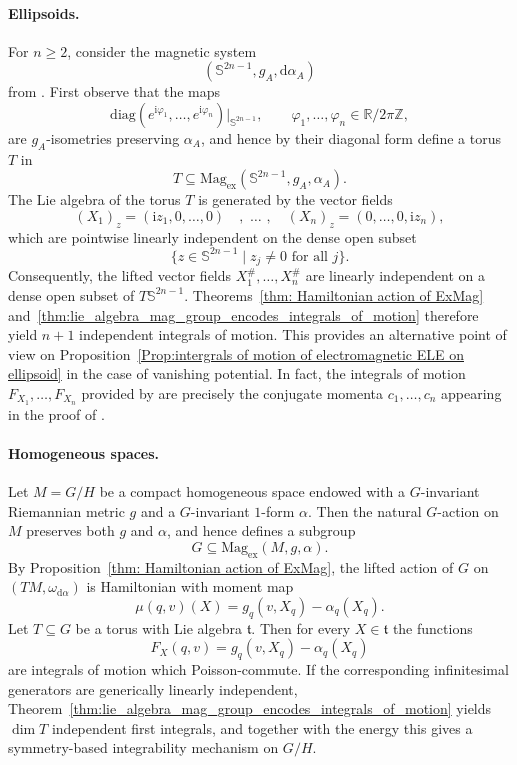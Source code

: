 \documentclass[11pt,reqno]{amsart}
\newcommand{\IR}{{\mathbb R}}%
\newcommand{\IZ}{{\mathbb Z}}%
\theoremstyle{plain}
\theoremstyle{definition}
\numberwithin{equation}{section}
\def\d{\delta}
\def\d{\delta}
\def\d{{\mathrm{d}}}
\def\S{{\mathbb{S}^{2n-1}}}
\def\i{{\mathrm{i}}}
\begin{document}
\paragraph{\textbf{Ellipsoids.}}
For $n\geq 2$, consider the magnetic system \[(\S,g_A,\d\alpha_A)\] from . First observe that the maps
\begin{equation}
\label{eq: example Hamiltonian action on ellipsoid}
\mathrm{diag}(e^{\i\varphi_1},\ldots,e^{\i\varphi_n})|_{\S},
\qquad \varphi_1,\ldots,\varphi_n\in\IR/2\pi\IZ,
\end{equation}
are $g_A$-isometries preserving $\alpha_A$, and hence by their diagonal form define a torus $T$ in
\[
T\subseteq\mathrm{Mag}_{\mathrm{ex}}(\S,g_A,\alpha_A).
\]
The Lie algebra of the torus $T$ is generated by the vector fields
\[
(X_1)_z=(\i z_1,0,\ldots,0) \quad  , \,\,\ldots \,\, ,\quad (X_n)_z=(0,\ldots,0,\i z_n),
\]
which are pointwise linearly independent on the dense open subset
\[
\{z\in \S \mid z_j\neq 0 \text{ for all } j\}.
\]
Consequently, the lifted vector fields $X_1^\#,\ldots,X_n^\#$ are linearly independent on a dense open subset of $T\S$. Theorems~\ref{thm: Hamiltonian action of ExMag} and~\ref{thm:lie_algebra_mag_group_encodes_integrals_of_motion} therefore yield $n+1$ independent integrals of motion. This provides an alternative point of view on Proposition~\ref{Prop:intergrals of motion of electromagnetic ELE on ellipsoid} in the case of vanishing potential. In fact, the integrals of motion $F_{X_1}, \ldots , F_{X_n}$ provided by  are precisely the conjugate momenta $c_1,\ldots , c_n$ appearing in the proof of .\\

\paragraph{\textbf{Homogeneous spaces.}}
Let $M=G/H$ be a compact homogeneous space endowed with a $G$-invariant Riemannian metric $g$ and a $G$-invariant $1$-form $\alpha$. Then the natural $G$-action on $M$ preserves both $g$ and $\alpha$, and hence defines a subgroup
\[
G\subseteq \mathrm{Mag}_{\mathrm{ex}}(M,g,\alpha).
\]
By Proposition~\ref{thm: Hamiltonian action of ExMag}, the lifted action of $G$ on $(TM,\omega_{\d\alpha})$ is Hamiltonian with moment map
\[
\mu(q,v)(X)=g_q(v,X_q)-\alpha_q(X_q).
\]
Let $T\subseteq G$ be a torus with Lie algebra $\mathfrak t$. Then for every $X\in\mathfrak t$ the functions
\[
F_X(q,v)=g_q(v,X_q)-\alpha_q(X_q)
\]
are integrals of motion which Poisson-commute. If the corresponding infinitesimal generators are generically linearly independent, Theorem~\ref{thm:lie_algebra_mag_group_encodes_integrals_of_motion} yields $\dim T$ independent first integrals, and together with the energy this gives a symmetry-based integrability mechanism on $G/H$.\\
\end{document}
